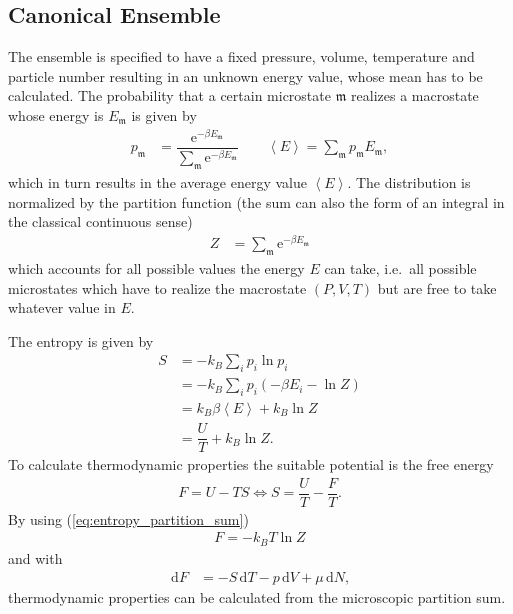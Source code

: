 \documentclass[a4paper,10pt]{article}
\newcommand{\td}{\,\text{d}}
\numberwithin{equation}{section}
\begin{document}
\begin{multicols}{2}
\subsection{Canonical Ensemble}
The ensemble is specified to have a fixed pressure, volume, temperature and particle number resulting in an unknown energy value, whose mean has to be calculated.
The probability that a certain microstate $\mathfrak{m}$ realizes a macrostate whose energy is $E_\mathfrak{m}$ is given by
\begin{align} 
  p_\mathfrak{m} &= \dfrac{\text{e}^{-\beta E_\mathfrak{m} }}{\sum_{\mathfrak{m}}^{}\text{e}^{-\beta E_\mathfrak{m} }}\qquad \left\langle E\right\rangle =\sum_{\mathfrak{m}}^{}p_\mathfrak{m}E_\mathfrak{m}
,\end{align} 
which in turn results in the average energy value $\left\langle E\right\rangle $.
The distribution is normalized by the partition function (the sum can also the form of an integral in the classical continuous sense)
\begin{align} 
  Z &= \sum_{\mathfrak{m}}^{}\text{e}^{-\beta E_\mathfrak{m}}
\end{align} 
which accounts for all possible values the energy $E$ can take, i.e.\ all possible microstates which have to realize the macrostate $\left(P,V,T\right)$ but are free to take whatever value in $E$.

The entropy is given by
\begin{align} 
  S &= -k_B\sum_{i}^{}p_i\ln p_i\\
    &= -k_B\sum_{i}^{}p_i\left(-\beta E_i-\ln Z\right)\\
    &= k_B\beta \left\langle E\right\rangle +k_B\ln Z\\
    &= \dfrac{U}{T}+k_B\ln Z \label{eq:entropy_partition_sum}
.\end{align} 
To calculate thermodynamic properties the suitable potential is the free energy 
\begin{align} 
  F=U-TS \Leftrightarrow S=\dfrac{U}{T}-\dfrac{F}{T}
.\end{align} 
By using (\ref{eq:entropy_partition_sum})
\begin{align} 
  F=-k_BT\ln Z
\end{align} 
and with
\begin{align} 
  \td F &= -S\td T-p\td V+\mu \td N
,\end{align} 
thermodynamic properties can be calculated from the microscopic partition sum.


\end{multicols}
\end{document}
